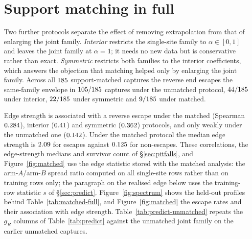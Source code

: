 \section{Support matching in full}
\label{app:matched}

Two further protocols separate the effect of removing extrapolation from that of enlarging the joint family.
\emph{Interior} restricts the single-site family to $\alpha\in[0,1]$ and leaves the joint family at $\alpha=1$; it
needs no new data but is conservative rather than exact. \emph{Symmetric} restricts both families to the interior
coefficients, which answers the objection that matching helped only by enlarging the joint family. Across all
$185$ support-matched captures the reverse end escapes the same-family envelope in $105/185$
captures under the unmatched protocol, $44/185$ under interior, $22/185$ under symmetric
and $9/185$ under matched.

Edge strength is associated with a reverse escape under the matched (Spearman $0.284$), interior
($0.41$) and symmetric ($0.362$) protocols, and only weakly under the unmatched one
($0.142$). Under the matched protocol the median edge strength is $2.09$ for escapes against
$0.125$ for non-escapes. These correlations, the edge-strength medians and survivor count of \S\ref{sec:pitfalls}, and
Figure~\ref{fig:matched} use the edge statistic stored with the matched analysis: the arm-$A$/arm-$B$ spread ratio
computed on all single-site rows rather than on training rows only; the paragraph on the realised edge below uses the
training-row statistic $s$ of \S\ref{sec:predict}. Figure~\ref{fig:spectrum} shows the held-out profiles behind
Table~\ref{tab:matched-full}, and Figure~\ref{fig:matched} the escape rates and their association with edge strength.
Table~\ref{tab:predict-unmatched} repeats the $g_R$ columns of Table~\ref{tab:predict} against the unmatched joint
family on the earlier unmatched captures.

